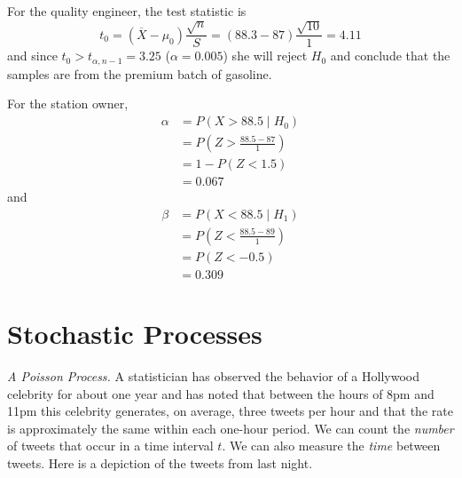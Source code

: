 For the quality engineer, the test statistic is
\[
t_0 = \left( \overline{X} - \mu_0 \right)\frac{\sqrt{n}}{S} 
= \left(88.3 - 87\right) \frac{\sqrt{10}}{1} 
 = 4.11
\]
and since $t_0 > t_{\alpha,n-1}=3.25$ ($\alpha=0.005$) she will
reject $H_0$ and conclude that the samples are from the premium
batch of gasoline.

For the station owner,
\begin{align*}
\alpha &= P(X > 88.5 \mid H_0) \\
&= P\left( Z > \frac{88.5-87}{1} \right) \\
&= 1 - P(Z < 1.5) \\
&= 0.067
\end{align*}
and
\begin{align*}
\beta &= P(X < 88.5 \mid H_1) \\
&= P\left( Z < \frac{88.5-89}{1} \right) \\
&= P(Z < -0.5) \\
&= 0.309
\end{align*}

\section{Stochastic Processes}

\emph{A Poisson Process.} A statistician has observed the behavior of
a Hollywood celebrity for about one year and has noted that between
the hours of 8pm and 11pm this celebrity generates, on average, three
tweets per hour and that the rate is approximately the same within
each one-hour period.  We can count the \emph{number} of tweets that
occur in a time interval $t$. We can also measure the \emph{time}
between tweets. Here is a depiction of the tweets from last night.

\vspace{.2in}
\begin{center}
\end{center}

